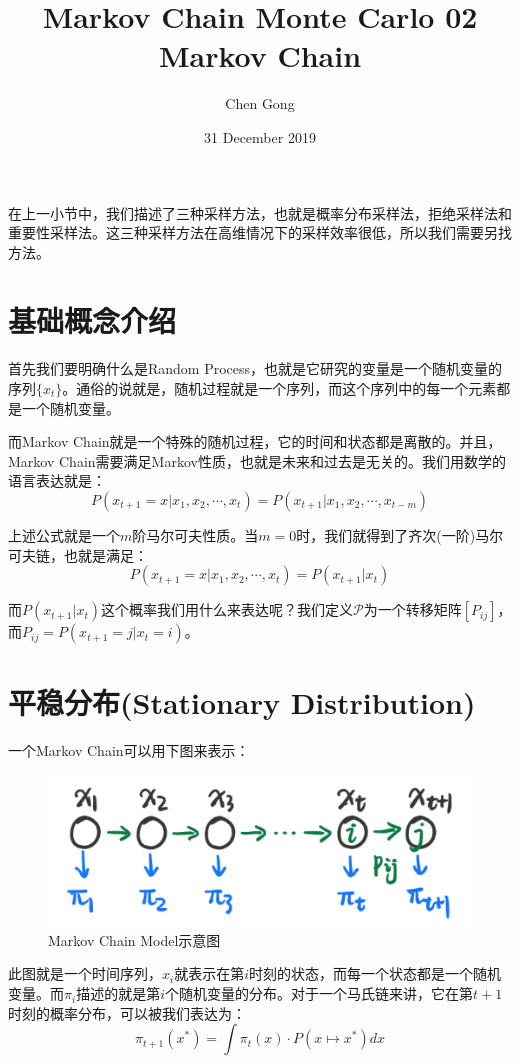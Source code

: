 \documentclass[a4paper]{article}
\title{Markov Chain Monte Carlo 02 Markov Chain}
\author{Chen Gong}
\date{31 December 2019}
\begin{document}
\maketitle
在上一小节中，我们描述了三种采样方法，也就是概率分布采样法，拒绝采样法和重要性采样法。这三种采样方法在高维情况下的采样效率很低，所以我们需要另找方法。
\section{基础概念介绍}
首先我们要明确什么是Random Process，也就是它研究的变量是一个随机变量的序列$\{x_t\}$。通俗的说就是，随机过程就是一个序列，而这个序列中的每一个元素都是一个随机变量。

而Markov Chain就是一个特殊的随机过程，它的时间和状态都是离散的。并且，Markov Chain需要满足Markov性质，也就是未来和过去是无关的。我们用数学的语言表达就是：
\begin{equation}
    P(x_{t+1}=x|x_1,x_2,\cdots,x_t) = P(x_{t+1}|x_1,x_2,\cdots,x_{t-m})
\end{equation}

上述公式就是一个$m$阶马尔可夫性质。当$m=0$时，我们就得到了齐次(一阶)马尔可夫链，也就是满足：
\begin{equation}
    P(x_{t+1}=x|x_1,x_2,\cdots,x_t) = P(x_{t+1}|x_{t})
\end{equation}

而$P(x_{t+1}|x_{t})$这个概率我们用什么来表达呢？我们定义$\mathcal{P}$为一个转移矩阵$[P_{ij}]$，而$P_{ij} = P(x_{t+1}=j|x_t=i)$。

\section{平稳分布(Stationary Distribution)}
一个Markov Chain可以用下图来表示：
\begin{figure}[H]
    \centering
    \includegraphics[width=.55\textwidth]{微信图片_20191231110648.png}
    \caption{Markov Chain Model示意图}
    \label{fig:my_label_1}
\end{figure}

此图就是一个时间序列，$x_i$就表示在第$i$时刻的状态，而每一个状态都是一个随机变量。而$\pi_i$描述的就是第$i$个随机变量的分布。对于一个马氏链来讲，它在第$t+1$时刻的概率分布，可以被我们表达为：
\begin{equation}
    \pi_{t+1}(x^\ast) = \int \pi_t(x)\cdot P(x\mapsto x^\ast) dx
\end{equation}
\end{document}

